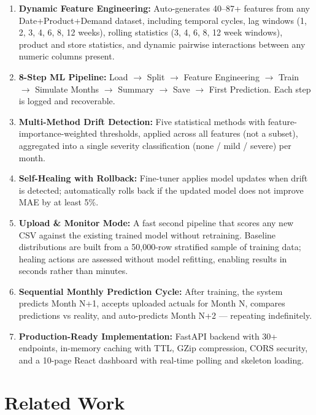 \documentclass[conference]{IEEEtran}
\begin{document}
\begin{enumerate}
    \item \textbf{Dynamic Feature Engineering:} Auto-generates 40--87+ features from any Date+Product+Demand dataset, including temporal cycles, lag windows (1, 2, 3, 4, 6, 8, 12 weeks), rolling statistics (3, 4, 6, 8, 12 week windows), product and store statistics, and dynamic pairwise interactions between any numeric columns present.

    \item \textbf{8-Step ML Pipeline:} Load $\rightarrow$ Split $\rightarrow$ Feature Engineering $\rightarrow$ Train $\rightarrow$ Simulate Months $\rightarrow$ Summary $\rightarrow$ Save $\rightarrow$ First Prediction. Each step is logged and recoverable.

    \item \textbf{Multi-Method Drift Detection:} Five statistical methods with feature-importance-weighted thresholds, applied across all features (not a subset), aggregated into a single severity classification (none / mild / severe) per month.

    \item \textbf{Self-Healing with Rollback:} Fine-tuner applies model updates when drift is detected; automatically rolls back if the updated model does not improve MAE by at least 5\%.

    \item \textbf{Upload \& Monitor Mode:} A fast second pipeline that scores any new CSV against the existing trained model without retraining. Baseline distributions are built from a 50,000-row stratified sample of training data; healing actions are assessed without model refitting, enabling results in seconds rather than minutes.

    \item \textbf{Sequential Monthly Prediction Cycle:} After training, the system predicts Month N+1, accepts uploaded actuals for Month N, compares predictions vs reality, and auto-predicts Month N+2 — repeating indefinitely.

    \item \textbf{Production-Ready Implementation:} FastAPI backend with 30+ endpoints, in-memory caching with TTL, GZip compression, CORS security, and a 10-page React dashboard with real-time polling and skeleton loading.
\end{enumerate}

\section{Related Work}
\end{document}
